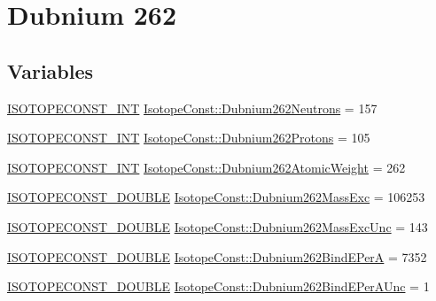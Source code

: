 \hypertarget{group___isotope_const-_dubnium-_db262}{}\section{Dubnium 262}
\label{group___isotope_const-_dubnium-_db262}
\subsection*{Variables}
\begin{DoxyCompactItemize}
\item 
\mbox{\hyperlink{group___isotope_const-_macros_ga5f18360b3e99483a35c32d789e62621c}{I\+S\+O\+T\+O\+P\+E\+C\+O\+N\+S\+T\+\_\+\+I\+NT}} \mbox{\hyperlink{group___isotope_const-_dubnium-_db262_gae5f14b089471cea45574186f4662641f}{Isotope\+Const\+::\+Dubnium262\+Neutrons}} = 157
\item 
\mbox{\hyperlink{group___isotope_const-_macros_ga5f18360b3e99483a35c32d789e62621c}{I\+S\+O\+T\+O\+P\+E\+C\+O\+N\+S\+T\+\_\+\+I\+NT}} \mbox{\hyperlink{group___isotope_const-_dubnium-_db262_gaa9ffb8b4a568457c3c57ec8459ae5142}{Isotope\+Const\+::\+Dubnium262\+Protons}} = 105
\item 
\mbox{\hyperlink{group___isotope_const-_macros_ga5f18360b3e99483a35c32d789e62621c}{I\+S\+O\+T\+O\+P\+E\+C\+O\+N\+S\+T\+\_\+\+I\+NT}} \mbox{\hyperlink{group___isotope_const-_dubnium-_db262_gab8bb7eea792595e2babeb3b3755ff74f}{Isotope\+Const\+::\+Dubnium262\+Atomic\+Weight}} = 262
\item 
\mbox{\hyperlink{group___isotope_const-_macros_ga8f45a7272ce02c0b4c65c44636ed719a}{I\+S\+O\+T\+O\+P\+E\+C\+O\+N\+S\+T\+\_\+\+D\+O\+U\+B\+LE}} \mbox{\hyperlink{group___isotope_const-_dubnium-_db262_ga503b95cf2dfbd4dc53931e3b8feeb6e8}{Isotope\+Const\+::\+Dubnium262\+Mass\+Exc}} = 106253
\item 
\mbox{\hyperlink{group___isotope_const-_macros_ga8f45a7272ce02c0b4c65c44636ed719a}{I\+S\+O\+T\+O\+P\+E\+C\+O\+N\+S\+T\+\_\+\+D\+O\+U\+B\+LE}} \mbox{\hyperlink{group___isotope_const-_dubnium-_db262_gad486619ecd67f39cda9f7f7c8ec97a62}{Isotope\+Const\+::\+Dubnium262\+Mass\+Exc\+Unc}} = 143
\item 
\mbox{\hyperlink{group___isotope_const-_macros_ga8f45a7272ce02c0b4c65c44636ed719a}{I\+S\+O\+T\+O\+P\+E\+C\+O\+N\+S\+T\+\_\+\+D\+O\+U\+B\+LE}} \mbox{\hyperlink{group___isotope_const-_dubnium-_db262_ga0ffdc87b622d6f8844ae820ef38aea59}{Isotope\+Const\+::\+Dubnium262\+Bind\+E\+PerA}} = 7352
\item 
\mbox{\hyperlink{group___isotope_const-_macros_ga8f45a7272ce02c0b4c65c44636ed719a}{I\+S\+O\+T\+O\+P\+E\+C\+O\+N\+S\+T\+\_\+\+D\+O\+U\+B\+LE}} \mbox{\hyperlink{group___isotope_const-_dubnium-_db262_gab672a1f5877a8595ac74e2e0cb3c77af}{Isotope\+Const\+::\+Dubnium262\+Bind\+E\+Per\+A\+Unc}} = 1

\end{DoxyCompactItemize}
